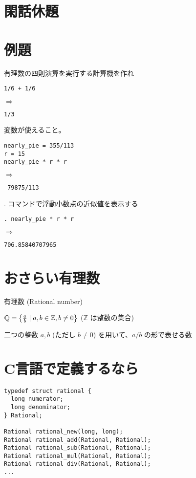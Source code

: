 \documentclass[slide,papersize,fleqn,22pt]{jsarticle}
\begin{document}
\section{閑話休題}
\figureA
\section{例題}
有理数の四則演算を実行する計算機を作れ
\tiny
\begin{tcolorbox}[box align=center,width=0.5\hsize,nobeforeafter]
  \texttt{1/6 + 1/6}
\end{tcolorbox}
{$\Rightarrow$}
\begin{tcolorbox}[box align=center,width=0.4\hsize,nobeforeafter]
\texttt{1/3}
\end{tcolorbox}
\vfill
変数が使えること。
\vfill
\begin{tcolorbox}[box align=center,width=0.5\hsize,nobeforeafter]
\begin{verbatim}
nearly_pie = 355/113
r = 15
nearly_pie * r * r
\end{verbatim}
\end{tcolorbox}
{$\Rightarrow$}
\begin{tcolorbox}[box align=center,width=0.4\hsize,nobeforeafter]
\texttt{ 79875/113}
\end{tcolorbox}
\vfill
. コマンドで浮動小数点の近似値を表示する
\vfill
\begin{tcolorbox}[box align=center,width=0.5\hsize,nobeforeafter]
\texttt{. nearly\_pie * r * r}
\end{tcolorbox}
{$\Rightarrow$}
\begin{tcolorbox}[box align=center,width=0.4\hsize,nobeforeafter]
\texttt{706.85840707965}
\end{tcolorbox}
\normalsize
\section{おさらい有理数}
有理数 (Rational number)

$\mathbb{Q} = \left\{{a \over b} \mid a, b \in \mathbb{Z}, b\ne
0\right\}$
($\mathbb{Z}$ は整数の集合)
\vspace{1em}

二つの整数 $a, b$ (ただし $b \ne 0$) を用いて、$a/b$ の形で表せる数

\section{C言語で定義するなら}
\tiny
\begin{verbatim}
typedef struct rational {
  long numerator;
  long denominator;
} Rational;

Rational rational_new(long, long);
Rational rational_add(Rational, Rational);  
Rational rational_sub(Rational, Rational);  
Rational rational_mul(Rational, Rational);  
Rational rational_div(Rational, Rational);
...
\end{verbatim}
\normalsize
\end{document}
